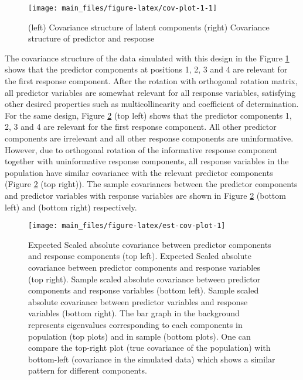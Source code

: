 \documentclass[review]{elsarticle}
\begin{document}
\begin{figure}
\texttt{[image: main\_files/figure-latex/cov-plot-1-1]} \caption{(left) Covariance structure of latent components (right) Covariance structure of predictor and response}\label{fig:cov-plot-1}
\end{figure}

The covariance structure of the data simulated with this design in the
Figure \ref{fig:cov-plot-1} shows that the predictor components at
positions 1, 2, 3 and 4 are relevant for the first response component.
After the rotation with orthogonal rotation matrix, all predictor
variables are somewhat relevant for all response variables, satisfying
other desired properties such as multicollinearity and coefficient of
determination. For the same design, Figure \ref{fig:est-cov-plot} (top
left) shows that the predictor components 1, 2, 3 and 4 are relevant for
the first response component. All other predictor components are
irrelevant and all other response components are uninformative. However,
due to orthogonal rotation of the informative response component
together with uninformative response components, all response variables
in the population have similar covariance with the relevant predictor
components (Figure \ref{fig:est-cov-plot} (top right)). The sample
covariances between the predictor components and predictor variables
with response variables are shown in Figure \ref{fig:est-cov-plot}
(bottom left) and (bottom right) respectively.













\begin{figure}
\texttt{[image: main\_files/figure-latex/est-cov-plot-1]} \caption{Expected Scaled absolute covariance between predictor
components and response components (top left). Expected Scaled absolute
covariance between predictor components and response variables (top
right). Sample scaled absolute covariance between predictor components
and response variables (bottom left). Sample scaled absolute covariance
between predictor variables and response variables (bottom right). The
bar graph in the background represents eigenvalues corresponding to each
components in population (top plots) and in sample (bottom plots). One
can compare the top-right plot (true covariance of the population) with
bottom-left (covariance in the simulated data) which shows a similar
pattern for different components.}\label{fig:est-cov-plot}
\end{figure}
\end{document}

